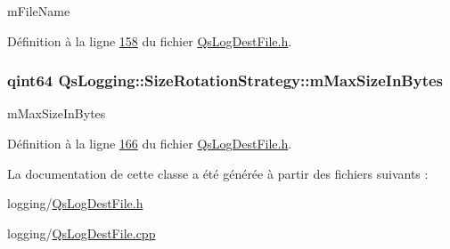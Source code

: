 m\-File\-Name 



Définition à la ligne \hyperlink{QsLogDestFile_8h_source_l00158}{158} du fichier \hyperlink{QsLogDestFile_8h_source}{Qs\-Log\-Dest\-File.\-h}.

\hypertarget{classQsLogging_1_1SizeRotationStrategy_ab9b1ed9b39de4c90762f38a32935fe01}{
\subsubsection[{m\-Max\-Size\-In\-Bytes}]{\setlength{\rightskip}{0pt plus 5cm}qint64 Qs\-Logging\-::\-Size\-Rotation\-Strategy\-::m\-Max\-Size\-In\-Bytes\hspace{0.3cm}{\ttfamily [private]}}}\label{classQsLogging_1_1SizeRotationStrategy_ab9b1ed9b39de4c90762f38a32935fe01}


m\-Max\-Size\-In\-Bytes 



Définition à la ligne \hyperlink{QsLogDestFile_8h_source_l00166}{166} du fichier \hyperlink{QsLogDestFile_8h_source}{Qs\-Log\-Dest\-File.\-h}.



La documentation de cette classe a été générée à partir des fichiers suivants \-:\begin{DoxyCompactItemize}
\item 
logging/\hyperlink{QsLogDestFile_8h}{Qs\-Log\-Dest\-File.\-h}\item 
logging/\hyperlink{QsLogDestFile_8cpp}{Qs\-Log\-Dest\-File.\-cpp}\end{DoxyCompactItemize}
